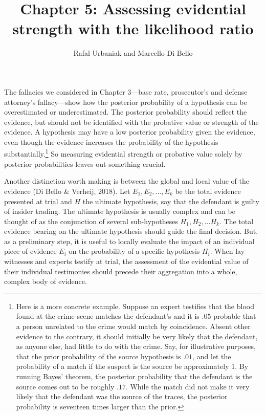 \documentclass[
  letterpaper,
  DIV=11,
  numbers=noendperiod]{scrartcl}
\title{Chapter 5: Assessing evidential strength with the likelihood
ratio}
\author{Rafal Urbaniak and Marcello Di Bello}
\date{}
\begin{document}
\maketitle
\ifdefined\Shaded\renewenvironment{Shaded}{\begin{tcolorbox}[frame hidden, boxrule=0pt, borderline west={3pt}{0pt}{shadecolor}, breakable, enhanced, interior hidden, sharp corners]}{\end{tcolorbox}}\fi

The fallacies we considered in Chapter 3---base rate, prosecutor's and
defense attorney's fallacy---show how the posterior probability of a
hypothesis can be overestimated or underestimated. The posterior
probability should reflect the evidence, but should not be identified
with the probative value or strength of the evidence. A hypothesis may
have a low posterior probability given the evidence, even though the
evidence increases the probability of the hypothesis
substantially.\footnote{Here is a more concrete example. Suppose an
  expert testifies that the blood found at the crime scene matches the
  defendant's and it is \(.05\) probable that a person unrelated to the
  crime would match by coincidence. Absent other evidence to the
  contrary, it should initially be very likely that the defendant, as
  anyone else, had little to do with the crime. Say, for illustrative
  purposes, that the prior probability of the source hypothesis is
  \(.01\), and let the probability of a match if the suspect is the
  source be approximately 1. By running Bayes' theorem, the posterior
  probability that the defendant is the source comes out to be roughly
  \(.17\). While the match did not make it very likely that the
  defendant was the source of the traces, the posterior probability is
  seventeen times larger than the prior.} So measuring evidential
strength or probative value solely by posterior probabilities leaves out
something crucial.

Another distinction worth making is between the global and local value
of the evidence (Di Bello \& Verheij, 2018). Let \(E_1,E_2,\dots, E_k\)
be the total evidence presented at trial and \(H\) the ultimate
hypothesis, say that the defendant is guilty of insider trading. The
ultimate hypothesis is usually complex and can be thought of as the
conjunction of several sub-hypotheses \(H_1, H_2, \dots H_k\). The total
evidence bearing on the ultimate hypothesis should guide the final
decision. But, as a preliminary step, it is useful to locally evaluate
the impact of an individual piece of evidence \(E_i\) on the probability
of a specific hypothesis \(H_i\). When lay witnesses and experts testify
at trial, the assessment of the evidential value of their individual
testimonies should precede their aggregation into a whole, complex body
of evidence.
\end{document}
